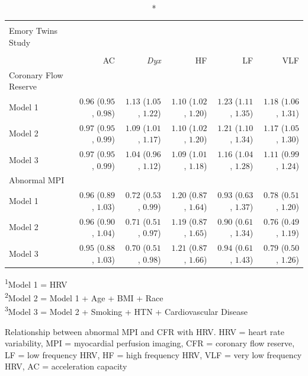 \documentclass[
  11pt,
  openany]{book}
\begin{document}
\captionsetup[table]{labelformat=empty,skip=1pt}
\begin{longtable}{lrrrrr}
\caption*{
\large Myocardial Perfusion Imaging and Morning HRV\\ 
\small Emory Twins Study\\ 
} \\ 
\toprule
 & AC & \emph{Dyx} & HF & LF & VLF \\ 
\midrule
\multicolumn{1}{l}{Coronary Flow Reserve} \\ 
\midrule
Model 1 & $0.96$ ($0.95$, $0.98$) & $1.13$ ($1.05$, $1.22$) & $1.10$ ($1.02$, $1.20$) & $1.23$ ($1.11$, $1.35$) & $1.18$ ($1.06$, $1.31$) \\ 
Model 2 & $0.97$ ($0.95$, $0.99$) & $1.09$ ($1.01$, $1.17$) & $1.10$ ($1.02$, $1.20$) & $1.21$ ($1.10$, $1.34$) & $1.17$ ($1.05$, $1.30$) \\ 
Model 3 & $0.97$ ($0.95$, $0.99$) & $1.04$ ($0.96$, $1.12$) & $1.09$ ($1.01$, $1.18$) & $1.16$ ($1.04$, $1.28$) & $1.11$ ($0.99$, $1.24$) \\ 
\midrule
\multicolumn{1}{l}{Abnormal MPI} \\ 
\midrule
Model 1 & $0.96$ ($0.89$, $1.03$) & $0.72$ ($0.53$, $0.99$) & $1.20$ ($0.87$, $1.64$) & $0.93$ ($0.63$, $1.37$) & $0.78$ ($0.51$, $1.20$) \\ 
Model 2 & $0.96$ ($0.90$, $1.04$) & $0.71$ ($0.51$, $0.97$) & $1.19$ ($0.87$, $1.65$) & $0.90$ ($0.61$, $1.34$) & $0.76$ ($0.49$, $1.19$) \\ 
Model 3 & $0.95$ ($0.88$, $1.03$) & $0.70$ ($0.51$, $0.98$) & $1.21$ ($0.87$, $1.66$) & $0.94$ ($0.61$, $1.43$) & $0.79$ ($0.50$, $1.26$) \\ 
\bottomrule
\end{longtable}
\vspace{-5mm}
\begin{minipage}{\linewidth}
\textsuperscript{1}Model 1 = HRV \\ 
\textsuperscript{2}Model 2 = Model 1 + Age + BMI + Race \\ 
\textsuperscript{3}Model 3 = Model 2 + Smoking + HTN + Cardiovascular Disease \\ 
\end{minipage}
\begin{minipage}{\linewidth}
Relationship between abnormal MPI and CFR with HRV. HRV = heart rate variability, MPI = myocardial perfusion imaging, CFR = coronary flow reserve, LF = low frequency HRV, HF = high frequency HRV, VLF = very low frequency HRV, AC = acceleration capacity\\ 
\end{minipage}
\end{document}
